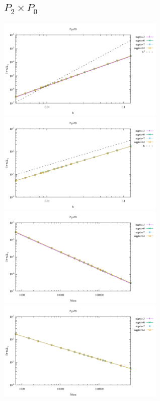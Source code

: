 \newpage
\subsection*{$P_2\times P_0$}
\begin{center}
\includegraphics[width=8cm]{python_codes/fieldstone_120/results/P2P0-velocity-h.pdf}
\includegraphics[width=8cm]{python_codes/fieldstone_120/results/P2P0-pressure-h.pdf}
\includegraphics[width=8cm]{python_codes/fieldstone_120/results/P2P0-velocity-Nfem.pdf}
\includegraphics[width=8cm]{python_codes/fieldstone_120/results/P2P0-pressure-Nfem.pdf}
\end{center}


